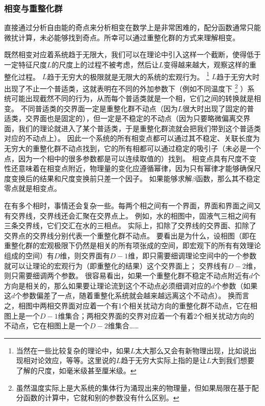 \documentclass[hyperref, UTF8, a4paper]{ctexart}
\begin{document}
\subsubsection{相变与重整化群}

直接通过分析自由能的奇点来分析相变在数学上是非常困难的，配分函数通常只能微扰计算，未必能够找到奇点。所幸可以通过重整化群的方式来理解相变。

既然相变对应着系统趋于无限大，我们可以在理论中引入这样一个截断，使得低于一定特征尺度$L$的尺度上的过程不被考虑，然后让$L$变得越来越大，观察这样的重整化过程。
$L$趋于无穷大的极限就是无限大的系统的宏观行为。%
\footnote{当然在一些比较复杂的理论中，如果$L$太大那么又会有新物理出现，比如说出现相对论效应，等等。这里说的$L$趋于无穷大实际上指的是让$L$大到我们想要了解的尺度，如毫米级甚至厘米级。}%
$L$趋于无穷大时出现了不止一个普适类，这就表明在不同的外加参数下（例如不同温度下%
\footnote{虽然温度实际上是大系统的集体行为涌现出来的物理量，但如果局限在基于配分函数的计算中，它就和别的参数没有什么区别。}%
）系统可能出现截然不同的行为，从而每个普适类就是一个相，它们之间的转换就是相变。
不同普适类的交界面一定是重整化群不动点（因为$L$很大时出现了固定的普适类，交界面也是固定的），但一定是不稳定的不动点（因为只要略微偏离交界面，我们的理论就进入了某个普适类，于是重整化群流就会把我们带到这个普适类对应的不动点上）。
因此一个系统的所有相变点都可以通过其不稳定、关联长度为无穷大的重整化群不动点找到，它的所有相都可以通过稳定的吸引子（未必是一个点，因为一个相中的很多参数都是可以连续取值的）找到。
相变点具有尺度不变性还意味着在相变点附近，物理量的变化应遵循幂律，因为只有幂律才能够确保尺度变换后的结果和尺度变换前只差一个因子。%
如果能够求解$\beta$函数，那么其不稳定零点就是相变点。

在有多个相时，事情还会复杂一些。每两个相之间有一个界面，界面和界面之间又有交界线，交界线还会汇聚在交界点上。
例如，水的相图中，固液气三相之间有三条交界线，它们交汇在水的三相点。
实际上，扣除了交界线的交界面、扣除了交界点的交界线分别代表一个重整化群不动点。
要看出是为什么，设相图（即在重整化群的宏观极限下仍然是相关的所有项张成的空间，即宏观下的所有有效理论组成的空间）有$D$维，则交界面有$D-1$维，即只需要细调理论空间中的一个参数就可以让理论的宏观行为（即重整化的结果）这个交界面上；
交界线有$D-2$维，则只需要细调两个参数。
很容易看出，如果一个重整化群不稳定不动点附近有$d$个方向是相关的，那么如果要让理论流到这个不动点必须细调对应的$d$个参数（如果这$d$个参数偏差了一点，随着重整化系统就会越来越远离这个不动点）。
换而言之，相图中两相交界面对应着一个有1个相关扰动方向的重整化群不动点，它在相图上是一个$D-1$维集合；两相交界面的交界对应着一个有着2个相关扰动方向的不动点，它在相图上是一个$D-2$维集合……
\end{document}

